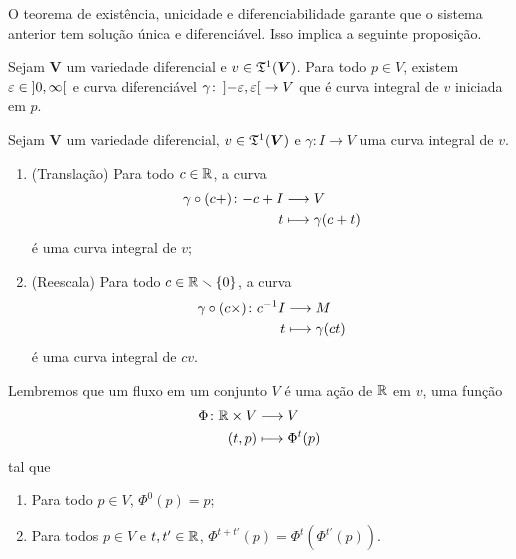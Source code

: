 O teorema de existência, unicidade e diferenciabilidade garante que o sistema anterior tem solução única e diferenciável. Isso implica a seguinte proposição.

\begin{proposition}
Sejam $\bm V$ um variedade diferencial e $v \in \mathfrak{T}^1(\bm V)$. Para todo $p \in V$, existem $\varepsilon \in \left]{0},{\infty}\right[$ e curva diferenciável $\gamma\colon \left]{-\varepsilon},{\varepsilon}\right[ \to V$ que é curva integral de $v$ iniciada em $p$.
\end{proposition}

\begin{proposition}
Sejam $\bm V$ um variedade diferencial, $v \in \mathfrak{T}^1(\bm V)$ e $\gamma\colon I \to V$ uma curva integral de $v$.
	\begin{enumerate}
	\item (Translação) Para todo $c \in \mathbb{R}$, a curva
		\begin{align*}
		{\gamma \circ (c +)}\colon {-c + I} &\longrightarrow {V} \\{t} &\longmapsto \gamma(c+t)
		\end{align*}
é uma curva integral de $v$;
	
	\item (Reescala) Para todo $c \in \mathbb{R} \smallsetminus \{0\}$, a curva
		\begin{align*}
		{\gamma \circ (c \times)}\colon {c^{-1}I} &\longrightarrow {M} \\{t} &\longmapsto \gamma(ct)
		\end{align*}
é uma curva integral de $cv$.
	\end{enumerate}
\end{proposition}

Lembremos que um fluxo em um conjunto $V$ é uma ação de $\mathbb{R}$ em $v$, uma função
	\begin{align*}
	{\Phi}\colon {\mathbb{R}\times V} &\longrightarrow {V} \\{(t,p)} &\longmapsto \Phi^t(p)
	\end{align*}
tal que
	\begin{enumerate}
	\item Para todo $p \in V$, $\Phi^0(p) = p$;
	\item Para todos $p \in V$ e $t,t' \in \mathbb{R}$, $\Phi^{t+t'}(p) = \Phi^t(\Phi^{t'}(p))$.
	\end{enumerate}

